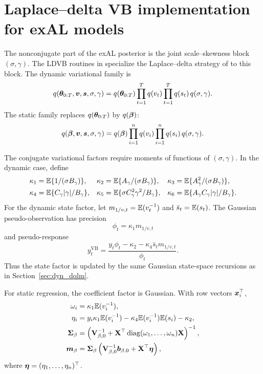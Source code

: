 \section{Laplace--delta VB implementation for exAL models}
\label{sec:ldvb_details}

The nonconjugate part of the exAL posterior is the joint scale--skewness
block $(\sigma,\gamma)$. The LDVB routines in  specialize the
Laplace--delta strategy of \citet{wang2013nonconjugatevb} to this block.
The dynamic variational family is
\begin{equation}
q(\boldsymbol{\theta}_{0:T},\boldsymbol{v},\boldsymbol{s},\sigma,\gamma)
=q(\boldsymbol{\theta}_{0:T})\prod_{t=1}^Tq(v_t)\prod_{t=1}^Tq(s_t)\,
q(\sigma,\gamma).
\label{eq:dyn_exdqlm_mf}
\end{equation}
The static family replaces $q(\boldsymbol{\theta}_{0:T})$ by
$q(\boldsymbol{\beta})$:
\begin{equation}
q(\boldsymbol{\beta},\boldsymbol{v},\boldsymbol{s},\sigma,\gamma)
=q(\boldsymbol{\beta})\prod_{i=1}^nq(v_i)\prod_{i=1}^nq(s_i)\,
q(\sigma,\gamma).
\label{eq:static_exal_mf}
\end{equation}

The conjugate variational factors require moments of functions of
$(\sigma,\gamma)$. In the dynamic case, define
\begin{align}
\kappa_1 &= \mathbb{E}\{1/(\sigma B_\gamma)\},&
\kappa_2 &= \mathbb{E}\{A_\gamma/(\sigma B_\gamma)\},&
\kappa_3 &= \mathbb{E}\{A_\gamma^2/(\sigma B_\gamma)\},\\
\kappa_4 &= \mathbb{E}\{C_\gamma|\gamma|/B_\gamma\},&
\kappa_5 &= \mathbb{E}\{\sigma C_\gamma^2\gamma^2/B_\gamma\},&
\kappa_6 &= \mathbb{E}\{A_\gamma C_\gamma|\gamma|/B_\gamma\}.
\label{eq:dyn_exdqlm_kappa}
\end{align}
For the dynamic state factor, let $m_{1/v,t}=\mathbb{E}(v_t^{-1})$ and
$\bar s_t=\mathbb{E}(s_t)$. The Gaussian pseudo-observation has precision
\begin{equation}
\phi_t=\kappa_1m_{1/v,t}
\label{eq:dyn_exdqlm_vb_precision}
\end{equation}
and pseudo-response
\begin{equation}
y_t^{\mathrm{VB}}
=
\frac{
y_t\phi_t-\kappa_2-\kappa_4\bar s_t m_{1/v,t}
}{\phi_t}.
\label{eq:dyn_exdqlm_vb_pseudo}
\end{equation}
Thus the state factor is updated by the same Gaussian state-space recursions
as in Section~\ref{sec:dyn_dqlm}.

For static regression, the coefficient factor is Gaussian. With row vectors
$\boldsymbol{x}_i^\top$,
\begin{align}
\omega_i&=\kappa_1\mathbb{E}(v_i^{-1}),\\
\eta_i&=
y_i\kappa_1\mathbb{E}(v_i^{-1})
-\kappa_4\mathbb{E}(v_i^{-1})\mathbb{E}(s_i)
-\kappa_2,\\
\mathbf{\Sigma}_\beta
&=\left(\mathbf{V}_{\beta,0}^{-1}
+\mathbf{X}^\top\operatorname{diag}(\omega_1,\ldots,\omega_n)\mathbf{X}\right)^{-1},\\
\boldsymbol{m}_\beta
&=\mathbf{\Sigma}_\beta
\left(\mathbf{V}_{\beta,0}^{-1}\boldsymbol{b}_{\beta,0}
+\mathbf{X}^\top\boldsymbol{\eta}\right),
\label{eq:static_exal_vb_beta}
\end{align}
where $\boldsymbol{\eta}=(\eta_1,\ldots,\eta_n)^\top$.

